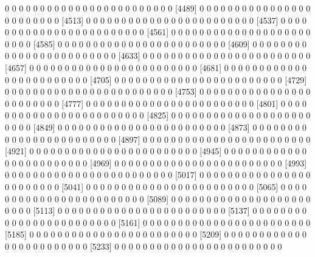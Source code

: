 \documentclass[11pt]{article}
\begin{document}
\begin{Schunk}
\begin{Soutput}
 [4465]  0  0  0  0  0  0  0  0  0  0  0  0  0  0  0  0  0  0  0  0  0  0  0  0
 [4489]  0  0  0  0  0  0  0  0  0  0  0  0  0  0  0  0  0  0  0  0  0  0  0  0
 [4513]  0  0  0  0  0  0  0  0  0  0  0  0  0  0  0  0  0  0  0  0  0  0  0  0
 [4537]  0  0  0  0  0  0  0  0  0  0  0  0  0  0  0  0  0  0  0  0  0  0  0  0
 [4561]  0  0  0  0  0  0  0  0  0  0  0  0  0  0  0  0  0  0  0  0  0  0  0  0
 [4585]  0  0  0  0  0  0  0  0  0  0  0  0  0  0  0  0  0  0  0  0  0  0  0  0
 [4609]  0  0  0  0  0  0  0  0  0  0  0  0  0  0  0  0  0  0  0  0  0  0  0  0
 [4633]  0  0  0  0  0  0  0  0  0  0  0  0  0  0  0  0  0  0  0  0  0  0  0  0
 [4657]  0  0  0  0  0  0  0  0  0  0  0  0  0  0  0  0  0  0  0  0  0  0  0  0
 [4681]  0  0  0  0  0  0  0  0  0  0  0  0  0  0  0  0  0  0  0  0  0  0  0  0
 [4705]  0  0  0  0  0  0  0  0  0  0  0  0  0  0  0  0  0  0  0  0  0  0  0  0
 [4729]  0  0  0  0  0  0  0  0  0  0  0  0  0  0  0  0  0  0  0  0  0  0  0  0
 [4753]  0  0  0  0  0  0  0  0  0  0  0  0  0  0  0  0  0  0  0  0  0  0  0  0
 [4777]  0  0  0  0  0  0  0  0  0  0  0  0  0  0  0  0  0  0  0  0  0  0  0  0
 [4801]  0  0  0  0  0  0  0  0  0  0  0  0  0  0  0  0  0  0  0  0  0  0  0  0
 [4825]  0  0  0  0  0  0  0  0  0  0  0  0  0  0  0  0  0  0  0  0  0  0  0  0
 [4849]  0  0  0  0  0  0  0  0  0  0  0  0  0  0  0  0  0  0  0  0  0  0  0  0
 [4873]  0  0  0  0  0  0  0  0  0  0  0  0  0  0  0  0  0  0  0  0  0  0  0  0
 [4897]  0  0  0  0  0  0  0  0  0  0  0  0  0  0  0  0  0  0  0  0  0  0  0  0
 [4921]  0  0  0  0  0  0  0  0  0  0  0  0  0  0  0  0  0  0  0  0  0  0  0  0
 [4945]  0  0  0  0  0  0  0  0  0  0  0  0  0  0  0  0  0  0  0  0  0  0  0  0
 [4969]  0  0  0  0  0  0  0  0  0  0  0  0  0  0  0  0  0  0  0  0  0  0  0  0
 [4993]  0  0  0  0  0  0  0  0  0  0  0  0  0  0  0  0  0  0  0  0  0  0  0  0
 [5017]  0  0  0  0  0  0  0  0  0  0  0  0  0  0  0  0  0  0  0  0  0  0  0  0
 [5041]  0  0  0  0  0  0  0  0  0  0  0  0  0  0  0  0  0  0  0  0  0  0  0  0
 [5065]  0  0  0  0  0  0  0  0  0  0  0  0  0  0  0  0  0  0  0  0  0  0  0  0
 [5089]  0  0  0  0  0  0  0  0  0  0  0  0  0  0  0  0  0  0  0  0  0  0  0  0
 [5113]  0  0  0  0  0  0  0  0  0  0  0  0  0  0  0  0  0  0  0  0  0  0  0  0
 [5137]  0  0  0  0  0  0  0  0  0  0  0  0  0  0  0  0  0  0  0  0  0  0  0  0
 [5161]  0  0  0  0  0  0  0  0  0  0  0  0  0  0  0  0  0  0  0  0  0  0  0  0
 [5185]  0  0  0  0  0  0  0  0  0  0  0  0  0  0  0  0  0  0  0  0  0  0  0  0
 [5209]  0  0  0  0  0  0  0  0  0  0  0  0  0  0  0  0  0  0  0  0  0  0  0  0
 [5233]  0  0  0  0  0  0  0  0  0  0  0  0  0  0  0  0  0  0  0  0  0  0  0  0

\end{Soutput}
\end{Schunk}
\end{document}
